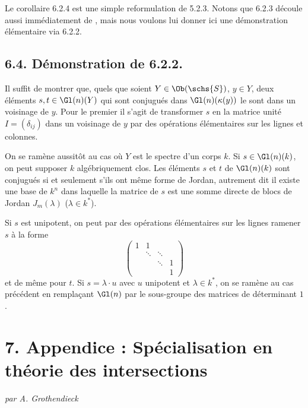 Le corollaire 6.2.4 est une simple reformulation de 5.2.3. Notons que 6.2.3 d\'ecoule aussi imm\'ediatement de , mais nous voulons lui donner ici une d\'emonstration \'el\'ementaire via 6.2.2.

\subsection*{6.4. D\'emonstration de 6.2.2.}

Il suffit de montrer que, quels que soient $Y \in \Ob(\schs{S})$, $y \in Y$, deux \'el\'ements $s, t \in \Gl(n)(Y)$ qui sont conjugu\'es dans $\Gl(n)(\kappa(y))$ le sont dans un voisinage de $y$. Pour le premier il s'agit de transformer $s$ en la matrice unit\'e $I = (\delta_{ij})$ dans un voisinage de $y$ par des op\'erations \'el\'ementaires sur les lignes et colonnes.

On se ram\`ene aussit\^ot au cas o\`u $Y$ est le spectre d'un corps $k$. Si $s \in \Gl(n)(k)$, on peut supposer $k$ alg\'ebriquement clos. Les \'el\'ements $s$ et $t$ de $\Gl(n)(k)$ sont conjugu\'es si et seulement s'ils ont m\^eme forme de Jordan, autrement dit il existe une base de $k^{n}$ dans laquelle la matrice de $s$ est une somme directe de blocs de Jordan $J_{m}(\lambda)$ ($\lambda \in k^{*}$).

Si $s$ est unipotent, on peut par des op\'erations \'el\'ementaires sur les lignes ramener $s$ \`a la forme
\[
\begin{pmatrix}
1 & 1 & & \\
& \ddots & \ddots & \\
& & \ddots & 1 \\
& & & 1
\end{pmatrix}
\]
et de m\^eme pour $t$. Si $s = \lambda \cdot u$ avec $u$ unipotent et $\lambda \in k^{*}$, on se ram\`ene au cas pr\'ec\'edent en rempla\c cant $\Gl(n)$ par le sous-groupe des matrices de d\'eterminant $1$.

\section*{7. Appendice : Sp\'ecialisation en th\'eorie des intersections}
\begin{flushright}
\textit{par A. Grothendieck}
\end{flushright}

